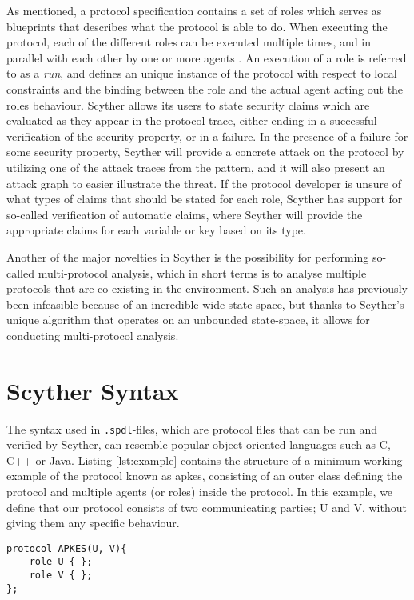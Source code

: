 As mentioned, a protocol specification contains a set of roles which serves as blueprints that describes what the protocol is able to do. When executing the protocol, each of the different roles can be executed multiple times, and in parallel with each other by one or more agents \cite{cremers2006scyther}. An execution of a role is referred to as a \emph{run}, and defines an unique instance of the protocol with respect to local constraints and the binding between the role and the actual agent acting out the roles behaviour. Scyther allows its users to state security claims which are evaluated as they appear in the protocol trace, either ending in a successful verification of the security property, or in a failure. In the presence of a failure for some security property, Scyther will provide a concrete attack on the protocol by utilizing one of the attack traces from the pattern, and it will also present an attack graph to easier illustrate the  threat. If the protocol developer is unsure of what types of claims that should be stated for each role, Scyther has support for so-called verification of automatic claims, where Scyther will provide the appropriate claims for each variable or key based on its type.

Another of the major novelties in Scyther is the possibility for performing so-called multi-protocol analysis, which in short terms is to analyse multiple protocols that are co-existing in the environment. Such an analysis has previously been infeasible because of an incredible wide state-space, but thanks to Scyther's unique algorithm that operates on an unbounded state-space, it allows for conducting multi-protocol analysis. 


\section{Scyther Syntax}


The syntax used in \verb!.spdl!-files, which are protocol files that can be run and verified by Scyther, can resemble popular object-oriented languages such as C, C++ or Java. Listing \ref{lst:example} contains the structure of a minimum working example of the protocol known as \gls{apkes}, consisting of an outer class defining the protocol and multiple agents (or roles) inside the protocol. In this example, we define that our protocol consists of two communicating parties; U and V, without giving them any specific behaviour.\newline

\begin{lstlisting}[caption={Example of the structure of a protocol modelled in Scyther, consisting of roles with different behaviours.}, label={lst:example}]
protocol APKES(U, V){
	role U { };
	role V { };  
};
\end{lstlisting}


